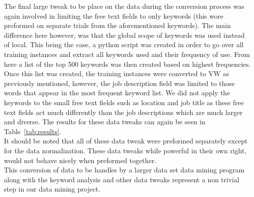 The final large tweak to be place on the data during the conversion process was again involved in limiting the free text fields
to only keywords (this wore preformed on separate trials from the aforementioned keywords). The main difference here however,
was that the global scope of keywords was used instead of local. This being the case, a python script was created in order
to go over all training instances and extract all keywords used and their frequency of use. From here a list of the top
500 keywords was then created based on highest frequencies. Once this list was created, the training instances were converted
to VW as previously mentioned, however, the job description field was limited to those words that appear in the most frequent
keyword list. We did not apply the keywords to the small free text fields such as location and job title as these free text
fields act much differently than the job descriptions which are much larger and diverse. The results for these data tweaks
can again be seen in Table~\ref{tab:results}.\\

It should be noted that all of these data tweak were preformed separately except for the data normalization. These data tweaks
while powerful in their own right, would not behave nicely when preformed together.\\

This conversion of data to be handles by a larger data set data mining program along with the keyword analysis and other
data tweaks represent a non trivial step in our data mining project.